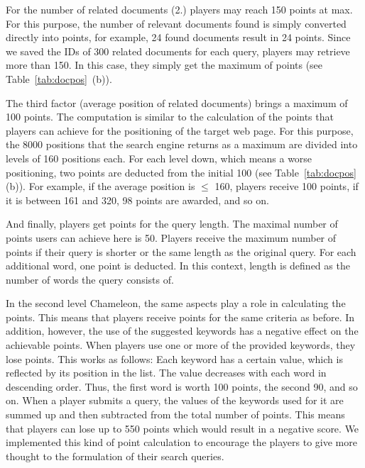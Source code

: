 For the number of related documents (2.) players may reach 150 points at max. For this purpose, the number of relevant documents found is simply converted directly into points, for example, 24 found documents result in 24 points. Since we saved the IDs of 300 related documents for each query, players may retrieve more than 150. In this case, they simply get the maximum of points (see Table~\ref{tab:docpos}~(b)).\par
The third factor (average position of related documents) brings a maximum of 100 points. The computation is similar to the calculation of the points that players can achieve for the positioning of the target web page. For this purpose, the 8000 positions that the search engine returns as a maximum are divided into levels of 160 positions each. For each level down, which means a worse positioning, two points are deducted from the initial 100 (see Table~\ref{tab:docpos} (b)). For example, if the average position is $\leq$ 160, players receive 100 points, if it is between 161 and 320, 98 points are awarded, and so on.\par
And finally, players get points for the query length. The maximal number of points users can achieve here is 50. Players receive the maximum number of points if their query is shorter or the same length as the original query. For each additional word, one point is deducted. In this context, length is defined as the number of words the query consists of.\par
In the second level Chameleon, the same aspects play a role in calculating the points. This means that players receive points for the same criteria as before. In addition, however, the use of the suggested keywords has a negative effect on the achievable points. When players use one or more of the provided keywords, they lose points. This works as follows: Each keyword has a certain value, which is reflected by its position in the list. The value decreases with each word in descending order. Thus, the first word is worth 100 points, the second 90, and so on. When a player submits a query, the values of the keywords used for it are summed up and then subtracted from the total number of points. This means that players can lose up to 550 points which would result in a negative score. We implemented this kind of point calculation to encourage the players to give more thought to the formulation of their search queries. 


